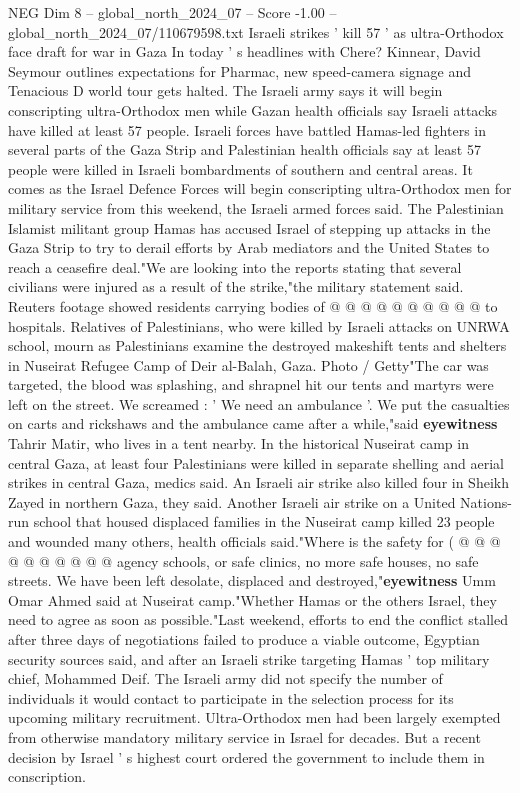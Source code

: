 \begin{textsample}{NEG Dim 8 – global\_north\_2024\_07 – Score -1.00 – global\_north\_2024\_07/110679598.txt}  \label{ex:f8_neg_410}
Israeli strikes ' kill 57 ' as ultra-Orthodox face draft for war in Gaza In today ' s headlines with Chere?
Kinnear, David Seymour outlines expectations for Pharmac, new speed-camera signage and Tenacious D world tour gets halted.
The Israeli army says it will begin conscripting ultra-Orthodox men while Gazan health officials say Israeli attacks have killed at least 57 people.
Israeli forces have battled Hamas-led fighters in several parts of the Gaza Strip and Palestinian health officials say at least 57 people were killed in Israeli bombardments of southern and central areas.
It comes as the Israel Defence Forces will begin conscripting ultra-Orthodox men for military service from this weekend, the Israeli armed forces said.
The Palestinian Islamist militant group Hamas has accused Israel of stepping up attacks in the Gaza Strip to try to derail efforts by Arab mediators and the United States to reach a ceasefire deal."We are looking into the reports stating that several civilians were injured as a result of the strike,"the military statement said.
Reuters footage showed residents carrying bodies of @ @ @ @ @ @ @ @ @ @ to hospitals.
Relatives of Palestinians, who were killed by Israeli attacks on UNRWA school, mourn as Palestinians examine the destroyed makeshift tents and shelters in Nuseirat Refugee Camp of Deir al-Balah, Gaza.
Photo / Getty"The car was targeted, the blood was splashing, and shrapnel hit our tents and martyrs were left on the street.
We screamed : ' We need an ambulance '.
We put the casualties on carts and rickshaws and the ambulance came after a while,"said \textbf{eyewitness} Tahrir Matir, who lives in a tent nearby.
In the historical Nuseirat camp in central Gaza, at least four Palestinians were killed in separate shelling and aerial strikes in central Gaza, medics said.
An Israeli air strike also killed four in Sheikh Zayed in northern Gaza, they said.
Another Israeli air strike on a United Nations-run school that housed displaced families in the Nuseirat camp killed 23 people and wounded many others, health officials said."Where is the safety for ( @ @ @ @ @ @ @ @ @ @ agency schools, or safe clinics, no more safe houses, no safe streets.
We have been left desolate, displaced and destroyed,"\textbf{eyewitness} Umm Omar Ahmed said at Nuseirat camp."Whether Hamas or the others Israel, they need to agree as soon as possible."Last weekend, efforts to end the conflict stalled after three days of negotiations failed to produce a viable outcome, Egyptian security sources said, and after an Israeli strike targeting Hamas ' top military chief, Mohammed Deif.
The Israeli army did not specify the number of individuals it would contact to participate in the selection process for its upcoming military recruitment.
Ultra-Orthodox men had been largely exempted from otherwise mandatory military service in Israel for decades.
But a recent decision by Israel ' s highest court ordered the government to include them in conscription.

\end{textsample}
